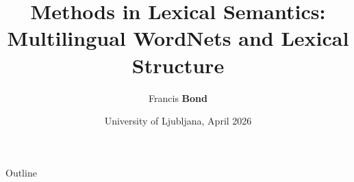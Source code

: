 \documentclass{beamer}
\title[Open Multilingual Wordnet]{Methods in Lexical Semantics: 
\\ Multilingual WordNets and Lexical Structure}
\author{Francis \textbf{Bond}}
\institute[Palacký]{Department of Asian Studies,
\\  Palacký University, Olomouc, Czechia
\\[1.5ex] \url{<bond@ieee.org>}}
\date{University of Ljubljana, April 2026}
\begin{document}
\maketitle
\begin{frame}{Outline}
   \tableofcontents
 \end{frame}





  
\end{document}
